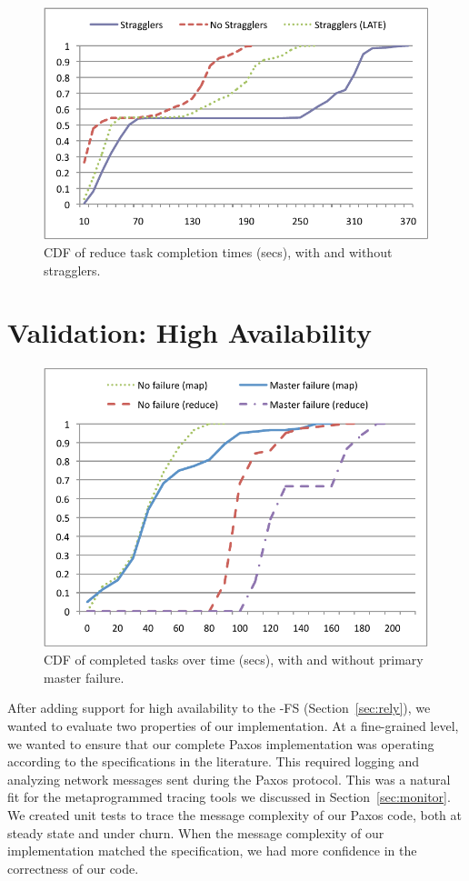 \begin{figure}[tb]
  \centering
  \includegraphics[width=0.95\linewidth]{graphs/reduce_stragglers}
  \caption{CDF of reduce task completion times (secs), with and without stragglers.}
  \label{fig:ec2reduce}
  \vspace{-12pt}
\end{figure}

\section{Validation: High Availability}
\label{sec:relyeval}

\begin{figure}[t]
  \centering
  \includegraphics[width=0.95\linewidth]{graphs/failover}
  \caption{CDF of completed tasks over time (secs), with and without
    primary master failure.}
  \label{fig:failover}
\end{figure}

After adding support for high availability to the \BOOM-FS \NN
(Section~\ref{sec:rely}), we wanted to evaluate two properties of our
implementation. At a fine-grained level, we wanted to ensure that our
complete Paxos implementation was operating according to the
specifications in the literature.  This required logging and analyzing
network messages sent during the Paxos protocol. This was a natural
fit for the metaprogrammed tracing tools we discussed in
Section~\ref{sec:monitor}. We created unit tests to trace the message
complexity of our Paxos code, both at steady state and under
churn. When the message complexity of our implementation matched the
specification, we had more confidence in the correctness of our code.


